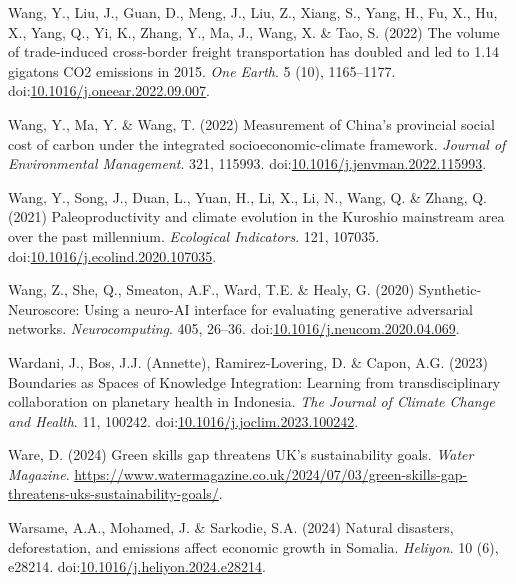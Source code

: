 \documentclass[
  letterpaper,
  DIV=11,
  numbers=noendperiod]{scrartcl}
\newlength{\cslhangindent}
\newenvironment{CSLReferences}[2] %
 {\begin{list}{}{%
  \setlength{\itemindent}{0pt}
  \setlength{\leftmargin}{0pt}
  \setlength{\parsep}{0pt}
  \ifodd #1
   \setlength{\leftmargin}{\cslhangindent}
   \setlength{\itemindent}{-1\cslhangindent}
  \fi
  \setlength{\itemsep}{#2\baselineskip}}}
 {\end{list}}
\begin{document}
\begin{CSLReferences}{0}{1}
Wang, Y., Liu, J., Guan, D., Meng, J., Liu, Z., Xiang, S., Yang, H., Fu,
X., Hu, X., Yang, Q., Yi, K., Zhang, Y., Ma, J., Wang, X. \& Tao, S.
(2022) The volume of trade-induced cross-border freight transportation
has doubled and led to 1.14 gigatons {CO2} emissions in 2015. \emph{One
Earth}. 5 (10), 1165--1177.
doi:\href{https://doi.org/10.1016/j.oneear.2022.09.007}{10.1016/j.oneear.2022.09.007}.

Wang, Y., Ma, Y. \& Wang, T. (2022) Measurement of {China}'s provincial
social cost of carbon under the integrated socioeconomic-climate
framework. \emph{Journal of Environmental Management}. 321, 115993.
doi:\href{https://doi.org/10.1016/j.jenvman.2022.115993}{10.1016/j.jenvman.2022.115993}.

Wang, Y., Song, J., Duan, L., Yuan, H., Li, X., Li, N., Wang, Q. \&
Zhang, Q. (2021) Paleoproductivity and climate evolution in the
{Kuroshio} mainstream area over the past millennium. \emph{Ecological
Indicators}. 121, 107035.
doi:\href{https://doi.org/10.1016/j.ecolind.2020.107035}{10.1016/j.ecolind.2020.107035}.

Wang, Z., She, Q., Smeaton, A.F., Ward, T.E. \& Healy, G. (2020)
Synthetic-{Neuroscore}: {Using} a neuro-{AI} interface for evaluating
generative adversarial networks. \emph{Neurocomputing}. 405, 26--36.
doi:\href{https://doi.org/10.1016/j.neucom.2020.04.069}{10.1016/j.neucom.2020.04.069}.

Wardani, J., Bos, J.J. (Annette), Ramirez-Lovering, D. \& Capon, A.G.
(2023) Boundaries as {Spaces} of {Knowledge Integration}: {Learning}
from transdisciplinary collaboration on planetary health in {Indonesia}.
\emph{The Journal of Climate Change and Health}. 11, 100242.
doi:\href{https://doi.org/10.1016/j.joclim.2023.100242}{10.1016/j.joclim.2023.100242}.

Ware, D. (2024) Green skills gap threatens {UK}'s sustainability goals.
\emph{Water Magazine}.
\url{https://www.watermagazine.co.uk/2024/07/03/green-skills-gap-threatens-uks-sustainability-goals/}.

Warsame, A.A., Mohamed, J. \& Sarkodie, S.A. (2024) Natural disasters,
deforestation, and emissions affect economic growth in {Somalia}.
\emph{Heliyon}. 10 (6), e28214.
doi:\href{https://doi.org/10.1016/j.heliyon.2024.e28214}{10.1016/j.heliyon.2024.e28214}.


\end{CSLReferences}
\end{document}

